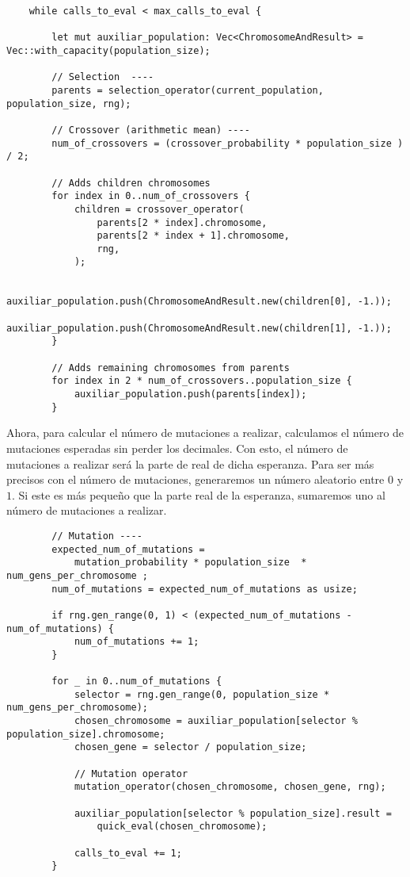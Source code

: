 \documentclass[size=a4, parskip=half, titlepage=false, toc=flat, toc=bib, 12pt]{scrartcl}
\begin{document}
\begin{verbatim}
    while calls_to_eval < max_calls_to_eval {

        let mut auxiliar_population: Vec<ChromosomeAndResult> = Vec::with_capacity(population_size);

        // Selection  ----
        parents = selection_operator(current_population, population_size, rng);

        // Crossover (arithmetic mean) ----
        num_of_crossovers = (crossover_probability * population_size ) / 2;

        // Adds children chromosomes
        for index in 0..num_of_crossovers {
            children = crossover_operator(
                parents[2 * index].chromosome,
                parents[2 * index + 1].chromosome,
                rng,
            );

            auxiliar_population.push(ChromosomeAndResult.new(children[0], -1.));
            auxiliar_population.push(ChromosomeAndResult.new(children[1], -1.));
        }

        // Adds remaining chromosomes from parents
        for index in 2 * num_of_crossovers..population_size {
            auxiliar_population.push(parents[index]);
        }
\end{verbatim}

Ahora, para calcular el número de mutaciones a realizar, calculamos el número de mutaciones esperadas sin perder los decimales. Con esto, el número de mutaciones a realizar será la parte de real de dicha esperanza. Para ser más precisos con el número de mutaciones, generaremos un número aleatorio entre $0$ y $1$. Si este es más pequeño que la parte real de la esperanza, sumaremos uno al número de mutaciones a realizar.

\begin{verbatim}
        // Mutation ----
        expected_num_of_mutations =
            mutation_probability * population_size  * num_gens_per_chromosome ;
        num_of_mutations = expected_num_of_mutations as usize;

        if rng.gen_range(0, 1) < (expected_num_of_mutations - num_of_mutations) {
            num_of_mutations += 1;
        }

        for _ in 0..num_of_mutations {
            selector = rng.gen_range(0, population_size * num_gens_per_chromosome);
            chosen_chromosome = auxiliar_population[selector % population_size].chromosome;
            chosen_gene = selector / population_size;

            // Mutation operator
            mutation_operator(chosen_chromosome, chosen_gene, rng);

            auxiliar_population[selector % population_size].result =
                quick_eval(chosen_chromosome);

            calls_to_eval += 1;
        }

\end{verbatim}
\end{document}
